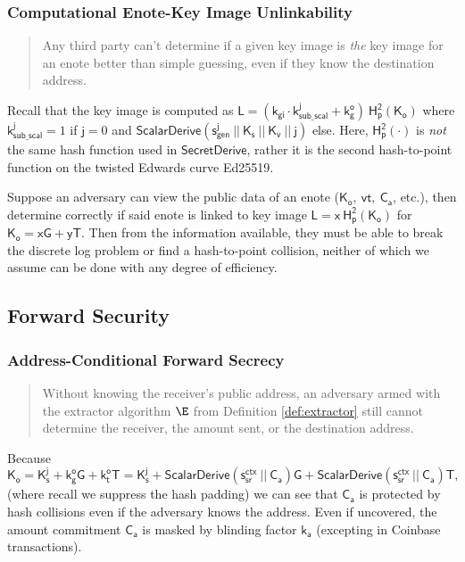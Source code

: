 \documentclass{article}
\theoremstyle{definition}
\newcommand{\6}{\mathbf}
\newcommand{\7}{\mathcal}
\newcommand{\scal}[1]{{\mathsf{ScalarDerive}(\sf{#1})}}
\renewcommand{\sf}[1]{{\mathsf{#1}}}
\begin{document}
\subsubsection{Computational Enote-Key Image Unlinkability} 

\begin{quote}
        Any third party can't determine if a given key image is \textit{the} key image for an enote better than simple guessing, even if they know the destination address.
\end{quote}

Recall that the key image is computed as $\sf{L = (k_{gi} \cdot k_{sub\_scal}^j + k_g^o) \ H_p^2(K_o)}$ where $\sf{k_{sub\_scal}^j} = 1$ if $\sf{j}=0$ and $\scal{s_{gen}^j \ || \ K_s \ || \ K_v \ || \ j}$ else. Here, $\sf{H_p^2(\cdot)}$ is \textit{not} the same hash function used in $\sf{SecretDerive}$, rather it is the second hash-to-point function on the twisted Edwards curve Ed25519.  
\medskip 

Suppose an adversary can view the public data of an enote ($\sf{K_o, \ vt, \ C_a}$, etc.),
then determine correctly if said enote is linked to key image $\sf{L = x \ H_p^2(K_o)}$ for $\sf{K_o = xG + yT}$. Then from the information available, they must be able to break the discrete log problem or find a hash-to-point collision, neither of which we assume can be done with any degree of efficiency.
\medskip 







\subsection{Forward Security}


\subsubsection{Address-Conditional Forward Secrecy} 

\begin{quote}
        Without knowing the receiver's public address, an adversary armed with the extractor algorithm $\E$ from Definition \ref{def:extractor} still cannot determine the receiver, the amount sent, or the destination address.
\end{quote}

Because 
$$\sf{K_o = K_s^j + k_g^o G + k_t^o T = K_s^j + \scal{s_{sr}^{ctx} \ || \ C_a} G + \scal{s_{sr}^{ctx} \ || \ C_a} T},$$
(where recall we suppress the hash padding) we can see that $\sf{C_a}$ is protected by hash collisions even if the adversary knows the address. Even if uncovered, the amount commitment $\sf{C_a}$ is masked by blinding factor $\sf{k_a}$ (excepting in Coinbase transactions).
\medskip 
\end{document}

